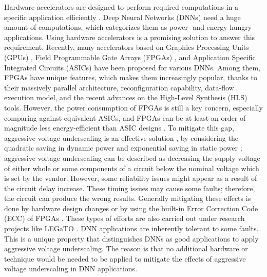 \documentclass[conference]{IEEEtran}
\begin{document}
Hardware accelerators are designed to perform required computations in a specific application efficiently \cite{arcas2015hardware, salami2015hatch, salami2017axledb, salami2016accelerating, melikoglu2019novel, gizopoulos2019modern}. Deep Neural Networks (DNNs) need a huge amount of computations, which categorizes them as power- and energy-hungry applications. Using hardware accelerators is a promising solution to answer this requirement. Recently, many accelerators based on Graphics Processing Units (GPUs) \cite{nurvitadhi2017can}, Field Programmable Gate Arrays (FPGAs) \cite{acc1,acc2,acc5,review3}, and Application Specific Integrated Circuits (ASICs) \cite{reagen2016minerva,skippynn} have been proposed for various DNNs. Among them, FPGAs have unique features, which makes them increasingly popular, thanks to their massively parallel architecture, reconfiguration capability, data-flow execution model, and the recent advances on the High-Level Synthesis (HLS) tools. However, the power consumption of FPGAs is still a key concern, especially comparing against equivalent ASICs, and FPGAs can be at least an order of magnitude less energy-efficient than ASIC designs \cite{nurvitadhi2016accelerating}. To mitigate this gap, aggressive voltage underscaling is an effective solution \cite{salami2018comprehensive, salami2018aggressive}, by considering the quadratic saving in dynamic power and exponential saving in static power \cite{salamin2019selecting}; aggressive voltage underscaling can be described as decreasing the supply voltage of either whole or some components of a circuit below the nominal voltage which is set by the vendor. However, some reliability issues might appear as a result of the circuit delay increase. These timing issues may cause some faults; therefore, the circuit can produce the wrong results. Generally mitigating these effects is done by hardware design changes\cite{razor,understanding} or by using the built-in Error Correction Code (ECC) of FPGAs \cite{salami2019evaluating}. These types of efforts are also carried out under research projects like LEGaTO \cite{salami2019legato, cristal2018legato}. DNN applications are inherently tolerant to some faults. This is a unique property that distinguishes DNNs as good applications to apply aggressive voltage underscaling. The reason is that no additional hardware or technique would be needed to be applied to mitigate the effects of aggressive voltage underscaling in DNN applications.  
\end{document}
